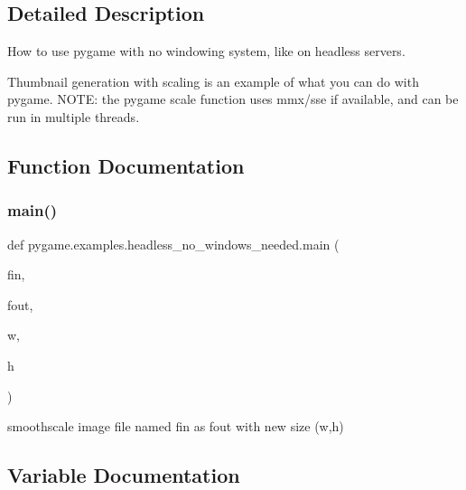 \subsection{Detailed Description}
\begin{DoxyVerb}How to use pygame with no windowing system, like on headless servers.

Thumbnail generation with scaling is an example of what you can do with pygame.
NOTE: the pygame scale function uses mmx/sse if available, and can be run 
  in multiple threads.\end{DoxyVerb}
 

\subsection{Function Documentation}
\mbox{\label{namespacepygame_1_1examples_1_1headless__no__windows__needed_a8c976583b5b94b1c6d860e0ddbd4b53c}} 
\subsubsection{\texorpdfstring{main()}{main()}}
{\footnotesize\ttfamily def pygame.\+examples.\+headless\+\_\+no\+\_\+windows\+\_\+needed.\+main (\begin{DoxyParamCaption}\item[{}]{fin,  }\item[{}]{fout,  }\item[{}]{w,  }\item[{}]{h }\end{DoxyParamCaption})}

\begin{DoxyVerb}smoothscale image file named fin as fout with new size (w,h)\end{DoxyVerb}
 

\subsection{Variable Documentation}
\mbox{\label{namespacepygame_1_1examples_1_1headless__no__windows__needed_aaeeb81391569b93813c4037d4da379ee}} 
